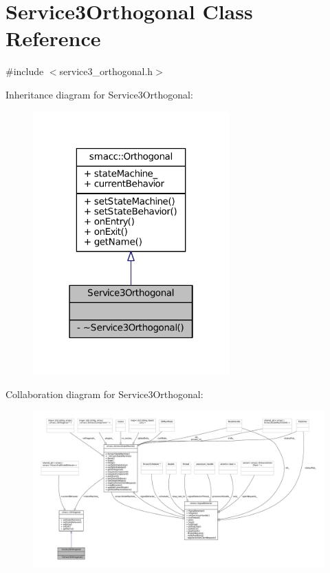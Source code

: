 \hypertarget{classService3Orthogonal}{}\section{Service3\+Orthogonal Class Reference}
\label{classService3Orthogonal}


{\ttfamily \#include $<$service3\+\_\+orthogonal.\+h$>$}



Inheritance diagram for Service3\+Orthogonal\+:
\nopagebreak
\begin{figure}[H]
\begin{center}
\leavevmode
\includegraphics[width=214pt]{classService3Orthogonal__inherit__graph}
\end{center}
\end{figure}


Collaboration diagram for Service3\+Orthogonal\+:
\nopagebreak
\begin{figure}[H]
\begin{center}
\leavevmode
\includegraphics[width=350pt]{classService3Orthogonal__coll__graph}
\end{center}
\end{figure}
